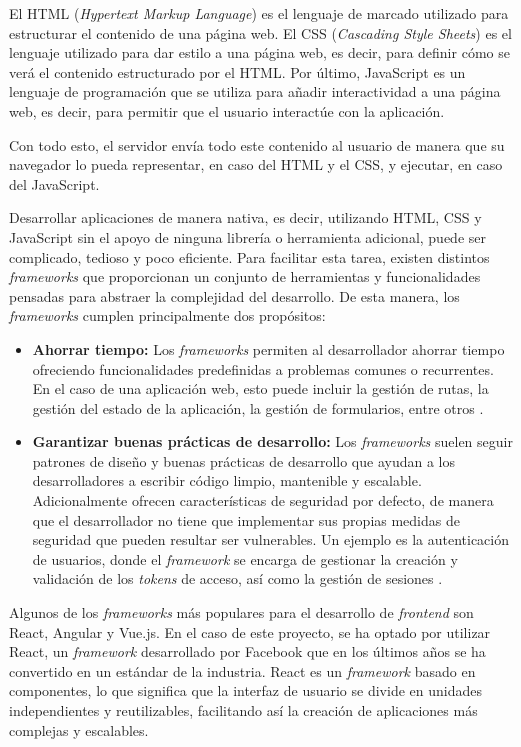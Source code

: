 El HTML (\textit{Hypertext Markup Language}) es el lenguaje de marcado utilizado para estructurar el contenido de una página web. El CSS (\textit{Cascading Style Sheets}) es el lenguaje utilizado para dar estilo a una página web, es decir, para definir cómo se verá el contenido estructurado por el HTML. Por último, JavaScript es un lenguaje de programación que se utiliza para añadir interactividad a una página web, es decir, para permitir que el usuario interactúe con la aplicación.

Con todo esto, el servidor envía todo este contenido al usuario de manera que su navegador lo pueda representar, en caso del HTML y el CSS, y ejecutar, en caso del JavaScript.

Desarrollar aplicaciones de manera nativa, es decir, utilizando HTML, CSS y JavaScript sin el apoyo de ninguna librería o herramienta adicional, puede ser complicado, tedioso y poco eficiente. Para facilitar esta tarea, existen distintos \textit{frameworks} que proporcionan un conjunto de herramientas y funcionalidades pensadas para abstraer la complejidad del desarrollo. De esta manera, los \textit{frameworks} cumplen principalmente dos propósitos:

\begin{itemize}
    \item \textbf{Ahorrar tiempo:} Los \textit{frameworks} permiten al desarrollador ahorrar tiempo ofreciendo funcionalidades predefinidas a problemas comunes o recurrentes. En el caso de una aplicación web, esto puede incluir la gestión de rutas, la gestión del estado de la aplicación, la gestión de formularios, entre otros \cite{framworks}.
    \item \textbf{Garantizar buenas prácticas de desarrollo:} Los \textit{frameworks} suelen seguir patrones de diseño y buenas prácticas de desarrollo que ayudan a los desarrolladores a escribir código limpio, mantenible y escalable. Adicionalmente ofrecen características de seguridad por defecto, de manera que el desarrollador no tiene que implementar sus propias medidas de seguridad que pueden resultar ser vulnerables. Un ejemplo es la autenticación de usuarios, donde el \textit{framework} se encarga de gestionar la creación y validación de los \textit{tokens} de acceso, así como la gestión de sesiones \cite{framworks}.
\end{itemize}

Algunos de los \textit{frameworks} más populares para el desarrollo de \textit{frontend} son React, Angular y Vue.js. En el caso de este proyecto, se ha optado por utilizar React, un \textit{framework} desarrollado por Facebook que en los últimos años se ha convertido en un estándar de la industria. React es un \textit{framework} basado en componentes, lo que significa que la interfaz de usuario se divide en unidades independientes y reutilizables, facilitando así la creación de aplicaciones más complejas y escalables.

